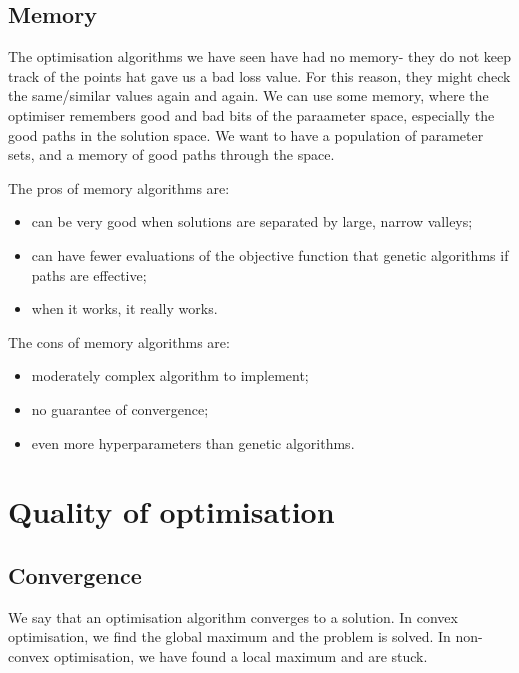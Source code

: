 \documentclass[a4paper, openany]{memoir}
\begin{document}
\subsection{Memory}
The optimisation algorithms we have seen have had no memory- they do not keep track of the points hat gave us a bad loss value. For this reason, they might check the same/similar values again and again. We can use some memory, where the optimiser remembers good and bad bits of the paraameter space, especially the good paths in the solution space. We want to have a population of parameter sets, and a memory of good paths through the space.

The pros of memory algorithms are:
\begin{itemize}
    \item can be very good when solutions are separated by large, narrow valleys;
    \item can have fewer evaluations of the objective function that genetic algorithms if paths are effective;
    \item when it works, it really works.
\end{itemize}
The cons of memory algorithms are:
\begin{itemize}
    \item moderately complex algorithm to implement;
    \item no guarantee of convergence;
    \item even more hyperparameters than genetic algorithms.
\end{itemize}
\newpage

\section{Quality of optimisation}
\subsection{Convergence}
We say that an optimisation algorithm converges to a solution. In convex optimisation, we find the global maximum and the problem is solved. In non-convex optimisation, we have found a local maximum and are stuck.
\end{document}

